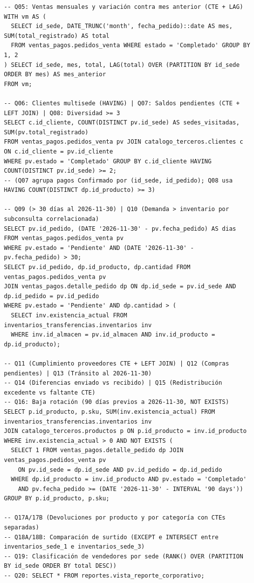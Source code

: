 \documentclass[11pt,oneside]{article}
\begin{document}
\begin{lstlisting}
-- Q05: Ventas mensuales y variación contra mes anterior (CTE + LAG)
WITH vm AS (
  SELECT id_sede, DATE_TRUNC('month', fecha_pedido)::date AS mes, SUM(total_registrado) AS total
  FROM ventas_pagos.pedidos_venta WHERE estado = 'Completado' GROUP BY 1, 2
) SELECT id_sede, mes, total, LAG(total) OVER (PARTITION BY id_sede ORDER BY mes) AS mes_anterior
FROM vm;

-- Q06: Clientes multisede (HAVING) | Q07: Saldos pendientes (CTE + LEFT JOIN) | Q08: Diversidad >= 3
SELECT c.id_cliente, COUNT(DISTINCT pv.id_sede) AS sedes_visitadas, SUM(pv.total_registrado)
FROM ventas_pagos.pedidos_venta pv JOIN catalogo_terceros.clientes c ON c.id_cliente = pv.id_cliente
WHERE pv.estado = 'Completado' GROUP BY c.id_cliente HAVING COUNT(DISTINCT pv.id_sede) >= 2;
-- (Q07 agrupa pagos Confirmado por (id_sede, id_pedido); Q08 usa HAVING COUNT(DISTINCT dp.id_producto) >= 3)

-- Q09 (> 30 días al 2026-11-30) | Q10 (Demanda > inventario por subconsulta correlacionada)
SELECT pv.id_pedido, (DATE '2026-11-30' - pv.fecha_pedido) AS dias FROM ventas_pagos.pedidos_venta pv
WHERE pv.estado = 'Pendiente' AND (DATE '2026-11-30' - pv.fecha_pedido) > 30;
SELECT pv.id_pedido, dp.id_producto, dp.cantidad FROM ventas_pagos.pedidos_venta pv
JOIN ventas_pagos.detalle_pedido dp ON dp.id_sede = pv.id_sede AND dp.id_pedido = pv.id_pedido
WHERE pv.estado = 'Pendiente' AND dp.cantidad > (
  SELECT inv.existencia_actual FROM inventarios_transferencias.inventarios inv
  WHERE inv.id_almacen = pv.id_almacen AND inv.id_producto = dp.id_producto);

-- Q11 (Cumplimiento proveedores CTE + LEFT JOIN) | Q12 (Compras pendientes) | Q13 (Tránsito al 2026-11-30)
-- Q14 (Diferencias enviado vs recibido) | Q15 (Redistribución excedente vs faltante CTE)
-- Q16: Baja rotación (90 días previos a 2026-11-30, NOT EXISTS)
SELECT p.id_producto, p.sku, SUM(inv.existencia_actual) FROM inventarios_transferencias.inventarios inv
JOIN catalogo_terceros.productos p ON p.id_producto = inv.id_producto
WHERE inv.existencia_actual > 0 AND NOT EXISTS (
  SELECT 1 FROM ventas_pagos.detalle_pedido dp JOIN ventas_pagos.pedidos_venta pv
    ON pv.id_sede = dp.id_sede AND pv.id_pedido = dp.id_pedido
  WHERE dp.id_producto = inv.id_producto AND pv.estado = 'Completado'
    AND pv.fecha_pedido >= (DATE '2026-11-30' - INTERVAL '90 days'))
GROUP BY p.id_producto, p.sku;

-- Q17A/17B (Devoluciones por producto y por categoría con CTEs separadas)
-- Q18A/18B: Comparación de surtido (EXCEPT e INTERSECT entre inventarios_sede_1 e inventarios_sede_3)
-- Q19: Clasificación de vendedores por sede (RANK() OVER (PARTITION BY id_sede ORDER BY total DESC))
-- Q20: SELECT * FROM reportes.vista_reporte_corporativo;
\end{lstlisting}
\end{document}

